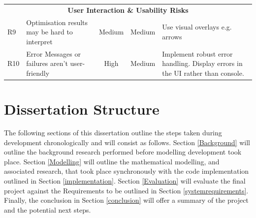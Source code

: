 \begin{longtable}{l p{4.5cm} c c p{4.5cm}}
\multicolumn{5}{c}{\textbf{User Interaction \& Usability Risks}}\\
R9 & Optimisation results may be hard to interpret & Medium & Medium & Use visual overlays e.g. arrows\\
R10 & Error Messages or failures aren't user-friendly & High & Medium & Implement robust error handling. Display errors in the UI rather than console.\\
\end{longtable}


\section{Dissertation Structure}
The following sections of this dissertation outline the steps taken during development chronologically and will consist as follows. Section \ref{Background} will outline the background research performed before modelling development took place. Section \ref{Modelling} will outline the mathematical modelling, and associated research, that took place synchronously with the code implementation outlined in Section \ref{implementation}. Section \ref{Evaluation} will evaluate the final project against the Requirements to be outlined in Section \ref{systemrequirements}. Finally, the conclusion in Section \ref{conclusion} will offer a summary of the project and the potential next steps. 

